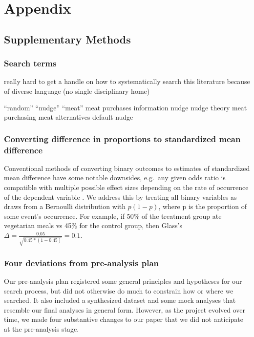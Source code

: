 \documentclass[sn-nature,pdflatex]{sn-jnl}
\begin{document}
\newpage

\section{Appendix}\label{appendix}

\subsection{Supplementary Methods}\label{supplementary-methods}

\subsubsection{Search terms}\label{search-terms}

really hard to get a handle on how to systematically search this
literature because of diverse language (no single disciplinary home)

``random'' ``nudge'' ``meat'' meat purchases information nudge nudge
theory meat purchasing meat alternatives default nudge

\subsubsection{Converting difference in proportions to standardized mean
difference}\label{converting-difference-in-proportions-to-standardized-mean-difference}

Conventional methods of converting binary outcomes to estimates of
standardized mean difference have some notable downsides, e.g.~any given
odds ratio is compatible with multiple possible effect sizes depending
on the rate of occurrence of the dependent variable \citep{gomila2021}.
We address this by treating all binary variables as draws from a
Bernoulli distribution with \(p(1 - p)\), where p is the proportion of
some event's occurrence. For example, if 50\% of the treatment group ate
vegetarian meals vs 45\% for the control group, then Glass's
\(\Delta = \frac{0.05}{\sqrt{0.45 * (1-0.45)}} = 0.1\).

\subsubsection{Four deviations from pre-analysis
plan}\label{four-deviations-from-pre-analysis-plan}

Our pre-analysis plan registered some general principles and hypotheses
for our search process, but did not otherwise do much to constrain how
or where we searched. It also included a synthesized dataset and some
mock analyses that resemble our final analyses in general form. However,
as the project evolved over time, we made four substantive changes to
our paper that we did not anticipate at the pre-analysis stage.
\end{document}
